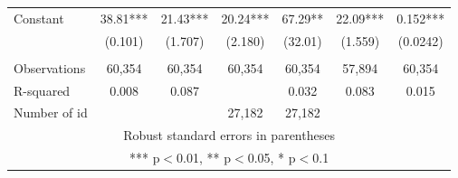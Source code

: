 \documentclass[]{article}
\begin{document}
\begin{tabular}{lcccccc}
Constant & 38.81*** & 21.43*** & 20.24*** & 67.29** & 22.09*** & 0.152*** \\
 & (0.101) & (1.707) & (2.180) & (32.01) & (1.559) & (0.0242) \\
 &  &  &  &  &  &  \\
Observations & 60,354 & 60,354 & 60,354 & 60,354 & 57,894 & 60,354 \\
R-squared & 0.008 & 0.087 &  & 0.032 & 0.083 & 0.015 \\
 Number of id &  &  & 27,182 & 27,182 &  &  \\ \hline
\multicolumn{7}{c}{ Robust standard errors in parentheses} \\
\multicolumn{7}{c}{ *** p$<$0.01, ** p$<$0.05, * p$<$0.1} \\
\end{tabular}
\end{document}
